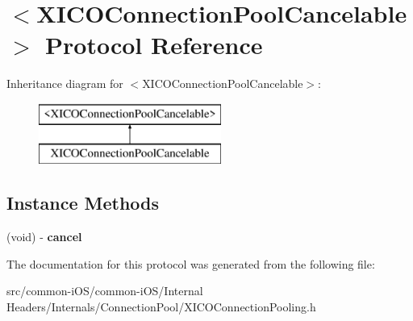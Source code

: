 \hypertarget{protocol_x_i_c_o_connection_pool_cancelable-p}{}\section{$<$X\+I\+C\+O\+Connection\+Pool\+Cancelable$>$ Protocol Reference}
\label{protocol_x_i_c_o_connection_pool_cancelable-p}
Inheritance diagram for $<$X\+I\+C\+O\+Connection\+Pool\+Cancelable$>$\+:\begin{figure}[H]
\begin{center}
\leavevmode
\includegraphics[height=2.000000cm]{protocol_x_i_c_o_connection_pool_cancelable-p}
\end{center}
\end{figure}
\subsection*{Instance Methods}
\begin{DoxyCompactItemize}
\item 
\hypertarget{protocol_x_i_c_o_connection_pool_cancelable-p_a61f93ca9f93cb7e4d69433ab4d7b0104}{}\label{protocol_x_i_c_o_connection_pool_cancelable-p_a61f93ca9f93cb7e4d69433ab4d7b0104} 
(void) -\/ {\bfseries cancel}
\end{DoxyCompactItemize}


The documentation for this protocol was generated from the following file\+:\begin{DoxyCompactItemize}
\item 
src/common-\/i\+O\+S/common-\/i\+O\+S/\+Internal Headers/\+Internals/\+Connection\+Pool/X\+I\+C\+O\+Connection\+Pooling.\+h\end{DoxyCompactItemize}
